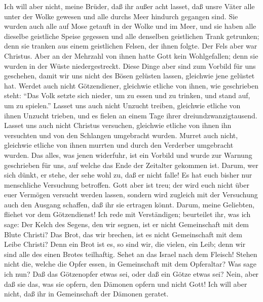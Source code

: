  Ich will aber nicht, meine Brüder, daß ihr außer acht
lasset, daß unsre Väter alle unter der Wolke gewesen und alle durchs
Meer hindurch gegangen sind.  Sie wurden auch alle auf
Mose getauft in der Wolke und im Meer,  und sie haben alle
dieselbe geistliche Speise gegessen und alle denselben geistlichen Trank
getrunken;  denn sie tranken aus einem geistlichen Felsen,
der ihnen folgte. Der Fels aber war Christus.  Aber an der
Mehrzahl von ihnen hatte Gott kein Wohlgefallen; denn sie wurden in der
Wüste niedergestreckt.  Diese Dinge aber sind zum Vorbild
für uns geschehen, damit wir uns nicht des Bösen gelüsten lassen,
gleichwie jene gelüstet hat.  Werdet auch nicht
Götzendiener, gleichwie etliche von ihnen, wie geschrieben steht: ``Das
Volk setzte sich nieder, um zu essen und zu trinken, und stand auf, um
zu spielen.''  Lasset uns auch nicht Unzucht treiben,
gleichwie etliche von ihnen Unzucht trieben, und es fielen an einem Tage
ihrer dreiundzwanzigtausend.  Lasset uns auch nicht
Christus versuchen, gleichwie etliche von ihnen ihn versuchten und von
den Schlangen umgebracht wurden.  Murret auch nicht,
gleichwie etliche von ihnen murrten und durch den Verderber umgebracht
wurden.  Das alles, was jenen widerfuhr, ist ein Vorbild
und wurde zur Warnung geschrieben für uns, auf welche das Ende der
Zeitalter gekommen ist.  Darum, wer sich dünkt, er stehe,
der sehe wohl zu, daß er nicht falle!  Es hat euch bisher
nur menschliche Versuchung betroffen. Gott aber ist treu; der wird euch
nicht über euer Vermögen versucht werden lassen, sondern wird zugleich
mit der Versuchung auch den Ausgang schaffen, daß ihr sie ertragen
könnt.  Darum, meine Geliebten, fliehet vor dem
Götzendienst!  Ich rede mit Verständigen; beurteilet ihr,
was ich sage:  Der Kelch des Segens, den wir segnen, ist
er nicht Gemeinschaft mit dem Blute Christi? Das Brot, das wir brechen,
ist es nicht Gemeinschaft mit dem Leibe Christi?  Denn
ein Brot ist es, so sind wir, die vielen, ein Leib; denn wir sind alle
des einen Brotes teilhaftig.  Sehet an das Israel nach
dem Fleisch! Stehen nicht die, welche die Opfer essen, in Gemeinschaft
mit dem Opferaltar?  Was sage ich nun? Daß das
Götzenopfer etwas sei, oder daß ein Götze etwas sei? 
Nein, aber daß sie das, was sie opfern, den Dämonen opfern und nicht
Gott! Ich will aber nicht, daß ihr in Gemeinschaft der Dämonen geratet.
